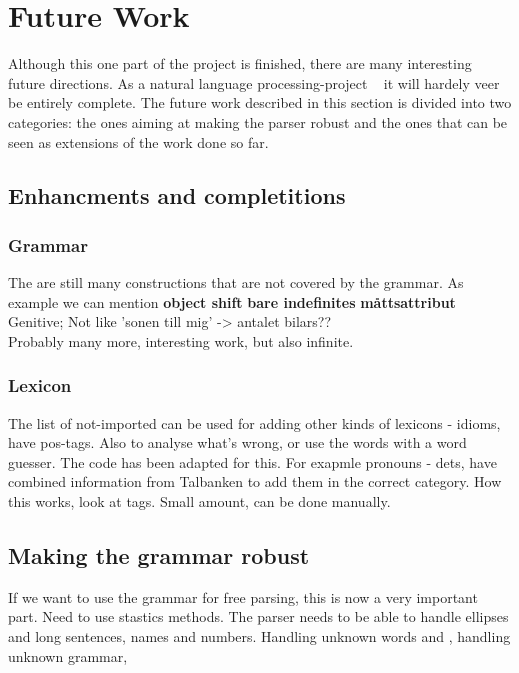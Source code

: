 \documentclass{report}
\begin{document}
\section{Future Work}
\label{sec:future}
Although this one part of the project is finished, there are many interesting future
directions. As a natural language processing-project ~ it will hardely veer be entirely
complete.
The future work described in this section is divided into two categories:
the ones aiming at making the parser robust and the ones that can be
seen  as extensions of the work done so far.
 
\subsection{Enhancments and completitions}
\subsubsection{Grammar}
The are still many constructions that are not covered by the grammar.
As example we can mention
\textbf{object shift}
\textbf{bare indefinites}
\textbf{måttsattribut}
Genitive; Not like 'sonen till mig' -> antalet bilars??\\

Probably many more, interesting work, but also infinite.
\subsubsection{Lexicon}
The list of not-imported can be used for adding other kinds of lexicons - idioms, have pos-tags.
Also to analyse what's wrong, or use the words with a word guesser. The code
has been adapted for this.
For exapmle pronouns - dets, have combined information from Talbanken to add them in the correct
category. How this works, look at tags. Small amount, can be done manually.


\subsection{Making the grammar robust}
If we want to use the grammar for free parsing, this is now a very important part.
Need to use stastics methods. The parser needs to be able to handle
ellipses and long sentences, names and numbers.
Handling unknown words and , handling unknown grammar, 
\end{document}

